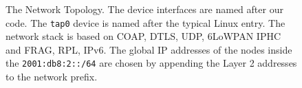 \documentclass[10pt, a4paper]{article}
\begin{document}
\begin{figure}[!hbtp]
        \caption{The Network Topology. The device interfaces are named after our code. The \texttt{tap0} device is named after the typical Linux entry. The network stack is based on COAP, DTLS, UDP, 6LoWPAN IPHC and FRAG, RPL, IPv6. The global IP addresses of the nodes inside the \texttt{2001:db8:2::/64} are chosen by appending the Layer 2 addresses to the network prefix.}
    \end{figure}
\end{document}

